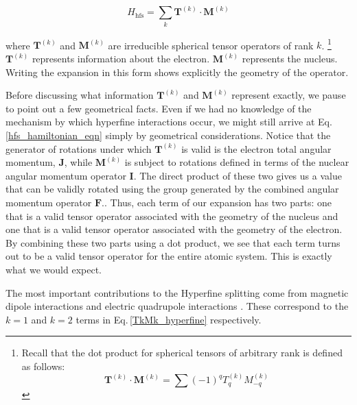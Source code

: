 \begin{equation}
H_{\mathrm{hfs}}=\sum_k \mathbf{T}^{(k)} \cdot \mathbf{M}^{(k)} \label{hfs_hamiltonian_eqn}
\end{equation}
\cite{schwartz_hyperfine_expansion}
\cite{experimental_hyperfine_alkali_arimondo}
\cite{chinesePhysics}

where $\mathbf{T}^{(k)}$ and $\mathbf{M}^{(k)}$ are irreducible spherical tensor operators of rank $k$.
\footnote{Recall that the dot product for spherical tensors of arbitrary rank is defined as follows:
\begin{equation}\label{TkMk_hyperfine}
\mathbf{T}^{(k)}\cdot\mathbf{M}^{(k)}=\sum (-1)^qT_q^{(k)}M_{-q}^{(k)}
\end{equation}
}
 $\mathbf{T}^{(k)}$ represents information about the electron.
$\mathbf{M}^{(k)}$ represents the nucleus.\cite{experimental_hyperfine_alkali_arimondo}\cite{schwartz_hyperfine_expansion}
\cite{sobelman_spectra}
Writing the expansion in this form shows explicitly the geometry of the operator. 

Before discussing what information $\mathbf{T}^{(k)}$ and $\mathbf{M}^{(k)}$ represent exactly,
we pause to point out a few geometrical facts. Even if we had no knowledge of the mechanism by which hyperfine interactions occur, we might still arrive at Eq.\,\ref{hfs_hamiltonian_eqn} simply by geometrical considerations.
Notice that the generator of rotations under which $\mathbf{T}^{(k)}$ is valid is the electron total angular momentum, $\mathbf{J}$, while $\mathbf{M}^{(k)}$ is subject to rotations defined in terms of the nuclear angular momentum operator $\mathbf{I}$. 
The direct product of these two gives us a value that can be validly rotated using the group generated by the combined angular momentum operator $\mathbf{F}$.\cite{Racah2}\cite{sobelman_spectra}. Thus, each term of our expansion has two parts: one that is a valid tensor operator associated with the geometry of the nucleus and one that is a valid tensor operator associated with the geometry of the electron. By combining these two parts using a dot product, we see that each term turns out to be a valid tensor operator for the entire atomic system. This is exactly what we would expect.

The most important contributions to the Hyperfine splitting come from magnetic dipole interactions and electric quadrupole interactions \cite{sobelman_spectra}\cite{schwartz_hyperfine_expansion}\cite{cuaMITnotes}. These correspond to the $k=1$ and $k=2$ terms in Eq.\,\ref{TkMk_hyperfine} respectively\cite{experimental_hyperfine_alkali_arimondo}.
